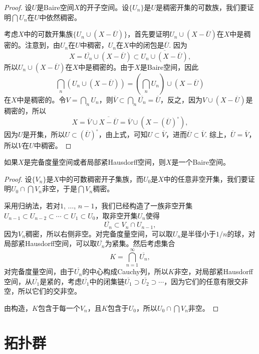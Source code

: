 \begin{proof}
	设$U$是Baire空间$X$的开子空间。设$\{U_n\}$是$U$是稠密开集的可数族，我们要证明$\bigcap U_n$在$U$中依然稠密。

	考虑$X$中的可数开集族$\{U_n\cup (X-\overline{U})\}$，首先要证明$U_n\cup (X-\overline{U})$在$X$中是稠密的。注意到，由$U_n$在$U$中稠密，$U_n$在$X$中的闭包是$\overline{U}$. 因为
	\[
	X=\overline{U_n}\cup (X-\overline{U})\subset \overline{U_n\cup (X-\overline{U})},
	\]
	所以$U_n\cup (X-\overline{U})$在$X$中是稠密的。由于$X$是Baire空间，因此
	\[
	\bigcap_n\left(U_n\cup (X-\overline{U})\right)=\left(\bigcap_n U_n\right)\cup (X-\overline{U}) 
	\]
	在$X$中是稠密的。令$V=\bigcap_n U_n$，则$\overline{V}\subset \bigcap_n \overline{U_n}=\overline{U}$，反之，因为$V\cup (X-\overline{U})$是稠密的，所以
	\[
		X=\overline{V}\cup \overline{X-\overline{U}}=\overline{V}\cup \left(X-(\overline{U})^\circ\right),
	\]
	因为$U$是开集，所以$U\subset (\overline{U})^\circ$，由上式，可知$U\subset \overline{V}$，进而$\overline{U}\subset \overline{V}$. 综上，$\overline{U}=\overline{V}$，所以$V$在$U$中稠密。
\end{proof}

\begin{thm}[Baire纲定理]
	如果$X$是完备度量空间或者局部紧Hausdorff空间，则$X$是一个Baire空间。
\end{thm}

\begin{proof}
	设$\{V_n\}$是$X$中的可数稠密开子集族，而$U_0$是$X$中的任意非空开集，我们要证明$U_0\cap \bigcap V_n$非空，于是$\bigcap V_n$稠密。

	采用归纳法，若对$1$, $\dots$, $n-1$，我们已经构造了一族非空开集$U_{n-1}\subset U_{n-2}\subset \cdots \subset U_1\subset U_0$，取非空开集$U_n$使得
	\[
	\overline {U_n}\subset V_n\cap U_{n-1},
	\]
	因为$V_n$稠密，所以右侧非空。对完备度量空间，可以取$U_n$是半径小于$1/n$的球，对局部紧Hausdorff空间，可以取$\overline {U_n}$为紧集。然后考虑集合
	\[
	K=\bigcap_{n=1}^\infty \overline {U_n},
	\]
	对完备度量空间，由于$\overline {U_n}$的中心构成Cauchy列，所以$K$非空，对局部紧Hausdorff空间，从$\overline {U_1}$是紧的，考虑$\overline {U_1}$中的闭集链$\overline {U_1}\supset \overline {U_2}\supset \cdots$，因为它们的任意有限交非空，所以它们的交非空。

	由构造，$K$包含于每一个$V_n$，且$K$包含于$U_0$，所以$U_0\cap \bigcap V_n$非空。
\end{proof}

\section{拓扑群}

